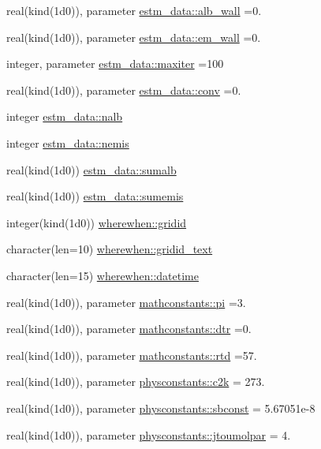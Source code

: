 \begin{DoxyCompactItemize}
\item 
real(kind(1d0)), parameter \hyperlink{namespaceestm__data_acdf885f5459c2301613674450cb0d4df}{estm\+\_\+data\+::alb\+\_\+wall} =0.
\item 
real(kind(1d0)), parameter \hyperlink{namespaceestm__data_afe2e8c1c729a44384912e9085576bc4b}{estm\+\_\+data\+::em\+\_\+wall} =0.
\item 
integer, parameter \hyperlink{namespaceestm__data_af2f45374dbd86a6f4a2a89914e3b17b1}{estm\+\_\+data\+::maxiter} =100
\item 
real(kind(1d0)), parameter \hyperlink{namespaceestm__data_adfd1d5673f5f4f967581cab77b4bc1ad}{estm\+\_\+data\+::conv} =0.
\item 
integer \hyperlink{namespaceestm__data_af0ef7f03ce2a913a43a1b3dcccc478f9}{estm\+\_\+data\+::nalb}
\item 
integer \hyperlink{namespaceestm__data_a781ad000e3af86859a4cba9329017189}{estm\+\_\+data\+::nemis}
\item 
real(kind(1d0)) \hyperlink{namespaceestm__data_af4bbbc09fb07fc02a62aa10ef9b0fc50}{estm\+\_\+data\+::sumalb}
\item 
real(kind(1d0)) \hyperlink{namespaceestm__data_ab6cbc4b326b1f0403459db52b8cf12dc}{estm\+\_\+data\+::sumemis}
\item 
integer(kind(1d0)) \hyperlink{namespacewherewhen_aad33529a6810bf6472d7734b51625654}{wherewhen\+::gridid}
\item 
character(len=10) \hyperlink{namespacewherewhen_a68eaceec6f42308af79f51f3c7cc76db}{wherewhen\+::gridid\+\_\+text}
\item 
character(len=15) \hyperlink{namespacewherewhen_afc93ac6f8f3cf65be44806bc77ba2597}{wherewhen\+::datetime}
\item 
real(kind(1d0)), parameter \hyperlink{namespacemathconstants_a31c67c4b97732eec2768d395e451a82c}{mathconstants\+::pi} =3.
\item 
real(kind(1d0)), parameter \hyperlink{namespacemathconstants_a3260b589a8581f09677797307607cbbf}{mathconstants\+::dtr} =0.
\item 
real(kind(1d0)), parameter \hyperlink{namespacemathconstants_a9e7d0779306b0fa5ccd63d7c7fea37c0}{mathconstants\+::rtd} =57.
\item 
real(kind(1d0)), parameter \hyperlink{namespacephysconstants_a3440be0c8f808e005a3f8400ebe8ea07}{physconstants\+::c2k} = 273.
\item 
real(kind(1d0)), parameter \hyperlink{namespacephysconstants_ace6c4e6b3043559bb2ee21b5f4c2cc8e}{physconstants\+::sbconst} = 5.\+67051e-\/8
\item 
real(kind(1d0)), parameter \hyperlink{namespacephysconstants_a73315ec4406d89b720497281c9353eb2}{physconstants\+::jtoumolpar} = 4.
\end{DoxyCompactItemize}
